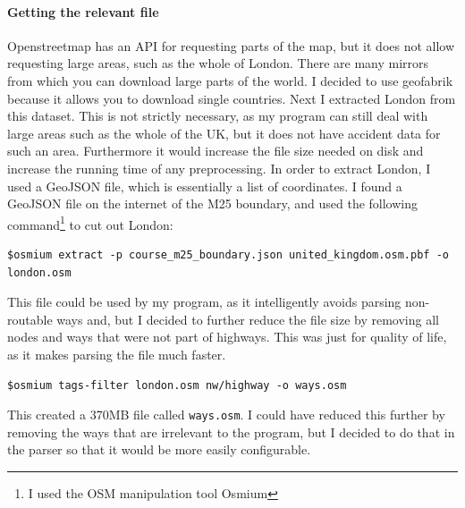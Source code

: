 \documentclass[11pt,twoside,a4paper]{article}
\begin{document}
\paragraph{Getting the relevant file}
Openstreetmap has an API for requesting parts of the map, but it does not allow requesting large areas, such as the whole of London. There are many mirrors from which you can download large parts of the world. I decided to use geofabrik \cite{geofabrik}
 because it allows you to download single countries. Next I extracted London from this dataset. This is not strictly necessary, as my program can still deal with large areas such as the whole of the UK, but it does not have accident data for such an area.
 Furthermore it would increase the file size needed on disk and increase the running time of any preprocessing. In order to extract London, I used a GeoJSON\cite{geojsondefinition} file, which is essentially a list of coordinates. I found a GeoJSON file on the internet \cite{geojsonsource}
 of the M25 boundary, and used the following command\footnote{I used the OSM manipulation tool Osmium} to cut out London: 
 \begin{verbatim}
$osmium extract -p course_m25_boundary.json united_kingdom.osm.pbf -o london.osm
 \end{verbatim}
 This file could be used by my program, as it intelligently avoids parsing non-routable ways and, but I decided to further reduce the file size by removing all nodes and ways that were not part of highways.
 This was just for quality of life, as it makes parsing the file much faster.
 \begin{verbatim}
$osmium tags-filter london.osm nw/highway -o ways.osm
 \end{verbatim}
 This created a 370MB file called \texttt{ways.osm}. I could have reduced this further by removing the ways that are irrelevant to the program, but I decided to do that in the parser so that it would be
 more easily configurable.
\end{document}
